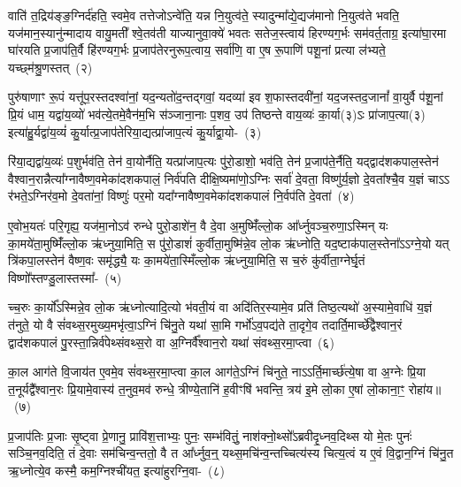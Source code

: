 वाति॑ त॒द्रिय॑ङ्ङ॒ग्निर्द॑हति॒ स्वमे॒व तत्तेजो\-ऽन्वे॑ति॒ यन्न नि॒युत्व॑ते॒ स्यादुन्मा᳚द्ये॒द्यज॑मानो नि॒युत्व॑ते भवति॒ यज॑मान॒स्यानु॑न्मादाय वायु॒मती᳚ श्वे॒तव॑ती याज्यानुवा॒क्ये॑ भवतः सतेज॒स्त्वाय॑ हिरण्यग॒र्भः सम॑वर्त॒ताग्र॒ इत्या॑घा॒रमा घा॑रयति प्र॒जा\-प॑ति॒र्वै हि॑रण्यग॒र्भः प्र॒जा\-प॑तेरनुरूप॒त्वाय॒ सर्वा॑णि॒ वा ए॒ष रू॒पाणि॑ पशू॒नां प्रत्या ल॑भ्यते॒ यच्छ्म॑श्रु॒णस्तत्~(२)\ip

पुरु॑षाणाꣳ रू॒पं यत्तू॑प॒रस्तदश्वा॑नां॒ यद॒न्यतो॑द॒न्तद्गवां॒ यदव्या॑ इव श॒फास्तदवी॑नां॒ यद॒जस्तद॒जानां᳚ वा॒युर्वै प॑शू॒नां प्रि॒यं धाम॒ यद्वा॑य॒व्यो॑ भव॑त्ये॒तमे॒वैन॑म॒भि स॑ञ्जाना॒नाः प॒शव॒ उप॑ तिष्ठन्ते वाय॒व्यः॑ का॒र्या(३)ऽः प्रा॑जाप॒त्या(३) इत्या॑हु॒र्यद्वा॑य॒व्यं॑ कु॒र्यात्प्र॒जा\-प॑तेरिया॒द्यत्प्रा॑जाप॒त्यं कु॒र्याद्वा॒यो-~(३)\ip

रि॑या॒द्यद्वा॑य॒व्यः॑ प॒शुर्भव॑ति॒ तेन॑ वा॒योर्नैति॒ यत्प्रा॑जाप॒त्यः पु॑रो॒डाशो॒ भव॑ति॒ तेन॑ प्र॒जा\-प॑ते॒र्नैति॒ यद्द्वाद॑श\-कपाल॒स्तेन॑ वैश्वान॒रान्नैत्या᳚ग्नावैष्ण॒वमेका॑\-दश\-कपालं॒ निर्व॑पति दीक्षि॒ष्यमा॑णो॒\-ऽग्निः सर्वा॑ दे॒वता॒ विष्णु॑र्य॒ज्ञो दे॒वता᳚श्चै॒व य॒ज्ञं चाऽऽ र॑भते॒\-ऽग्निर॑व॒मो दे॒वता॑नां॒ विष्णुः॑ पर॒मो यदा᳚ग्नावैष्ण॒वमेका॑\-दश\-कपालं नि॒र्वप॑ति दे॒वता॑~(४)\ip

ए॒वोभ॒यतः॑ परि॒गृह्य॒ यज॑मा॒नो\-ऽव॑ रुन्धे पुरो॒डाशे॑न॒ वै दे॒वा अ॒मुष्मिँ॑ल्लो॒क आ᳚र्ध्नुवञ्च॒रुणा॒ऽस्मिन् यः का॒मये॑ता॒मुष्मिँ॑ल्लो॒क ऋ॑ध्नुया॒मिति॒ स पु॑रो॒डाशं॑ कुर्वीता॒मुष्मि॑न्ने॒व लो॒क ऋ॑ध्नोति॒ यद॒ष्टाक॑पाल॒स्तेना᳚\-ऽऽग्ने॒यो यत् त्रि॑कपा॒लस्तेन॑ वैष्ण॒वः समृ॑द्ध्यै॒ यः का॒मये॑ता॒स्मिँल्लो॒क ऋ॑ध्नुया॒मिति॒ स च॒रुं कु॑र्वीता॒ग्नेर्घृ॒तं विष्णो᳚स्तण्डु॒लास्तस्मा᳚-~(५)\ip

च्च॒रुः का॒र्यो᳚\-ऽस्मिन्ने॒व लो॒क ऋ॑ध्नोत्यादि॒त्यो भ॑वती॒यं वा अदि॑तिर॒स्यामे॒व प्रति॑ तिष्ठ॒त्यथो॑ अ॒स्यामे॒वाधि॑ य॒ज्ञं त॑नुते॒ यो वै सं॑वथ्स॒रमुख्य॒मभृ॑त्वा॒\-ऽग्निं चि॑नु॒ते यथा॑ सा॒मि गर्भो॑\-ऽव॒पद्य॑ते ता॒दृगे॒व तदार्ति॒मार्च्छे᳚द्वैश्वान॒रं द्वाद॑श\-कपालं पु॒रस्ता॒न्निर्व॑पेथ्संवथ्स॒रो वा अ॒ग्निर्वै᳚श्वान॒रो यथा॑ संवथ्स॒रमा॒प्त्वा~(६)\ip

का॒ल आग॑ते वि॒जाय॑त ए॒वमे॒व सं॑वथ्स॒रमा॒प्त्वा का॒ल आग॑ते॒\-ऽग्निं चि॑नुते॒ नाऽऽर्ति॒मार्च्छ॑त्ये॒षा वा अ॒ग्नेः प्रि॒या त॒नूर्यद्वै᳚श्वान॒रः प्रि॒यामे॒वास्य॑ त॒नुव॒मव॑ रुन्धे॒ त्रीण्ये॒तानि॑ ह॒वीꣳषि॑ भवन्ति॒ त्रय॑ इ॒मे लो॒का ए॒षां लो॒काना॒ꣳ॒ रोहा॑य॥~(७)\ip

{\anuvakamend[{य॒द्रिय॑ङ्वा॒युर्यच्छ्म॑श्रु॒णस्तद्वा॒योर्नि॒र्वप॑ति दे॒वता॒स्तस्मा॑दा॒प्त्वाष्टात्रिꣳ॑शच्च}]}

प्र॒जा\-प॑तिः प्र॒जाः सृ॒ष्ट्वा प्रे॒णानु॒ प्रावि॑श॒त्ताभ्यः॒ पुनः॒ सम्भ॑वितुं॒ नाश॑क्नो॒थ्सो᳚\-ऽब्रवीदृ॒ध्नव॒दिथ्स यो मे॒तः पुनः॑ सञ्चि॒नव॒दिति॒ तं दे॒वाः सम॑चिन्व॒न्ततो॒ वै त आ᳚र्ध्नुव॒न्॒ यथ्स॒मचि॑न्व॒न्तच्चित्य॑स्य चित्य॒त्वं य ए॒वं वि॒द्वान॒ग्निं चि॑नु॒त ऋ॒ध्नोत्ये॒व कस्मै॒ कम॒ग्निश्ची॑यत॒ इत्या॑हुरग्नि॒वा-~(८)\ip

